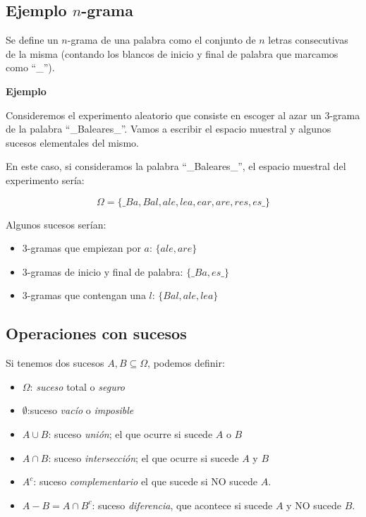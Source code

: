 \documentclass[]{book}
\providecommand{\tightlist}{%
  \setlength{\itemsep}{0pt}\setlength{\parskip}{0pt}}
\begin{document}
\hypertarget{ejemplo-n-grama}{%
\subsection{\texorpdfstring{Ejemplo \(n\)-grama}{Ejemplo n-grama}}\label{ejemplo-n-grama}}

Se define un \(n\)-grama de una palabra como el conjunto de \(n\) letras consecutivas de la misma (contando los blancos de inicio y final de palabra que marcamos como ``\_'').

\textbf{Ejemplo}

Consideremos el experimento aleatorio que consiste en escoger al azar un 3-grama de la palabra ``\_Baleares\_''. Vamos a escribir el espacio muestral y algunos sucesos elementales del mismo.

En este caso, si consideramos la palabra ``\_Baleares\_'', el espacio muestral del experimento sería:

\[\Omega=\{\_Ba, Bal, ale, lea, ear, are, res, es\_\}\]

Algunos sucesos serían:

\begin{itemize}
\tightlist
\item
  3-gramas que empiezan por \(a\): \(\{ale,are\}\)
\item
  3-gramas de inicio y final de palabra: \(\{\_Ba,es\_\}\)
\item
  3-gramas que contengan una \(l\): \(\{Bal,ale,lea\}\)
\end{itemize}

\hypertarget{operaciones-con-sucesos}{%
\subsection{Operaciones con sucesos}\label{operaciones-con-sucesos}}

Si tenemos dos sucesos \(A,B\subseteq \Omega\), podemos definir:

\begin{itemize}
\tightlist
\item
  \(\Omega\): \emph{suceso} total o \emph{seguro}
\item
  \(\emptyset\):suceso \emph{vacío} o \emph{imposible}
\item
  \(A\cup B\): suceso \emph{unión}; el que ocurre si sucede \(A\) o \(B\)
\item
  \(A\cap B\): suceso \emph{intersección}; el que ocurre si sucede \(A\) y \(B\)
\item
  \(A^c\): suceso \emph{complementario} el que sucede si NO sucede \(A\).
\item
  \(A- B=A\cap B^c\): suceso \emph{diferencia}, que acontece si sucede \(A\) y NO sucede \(B\).
\end{itemize}
\end{document}
